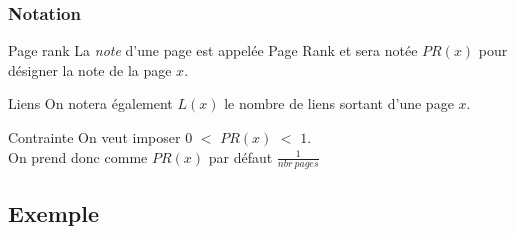 \documentclass{beamer}
\begin{document}
\begin{frame}
  \tableofcontents[currentsection,subsectionstyle=hide]
\end{frame}

\begin{frame}
  \frametitle{Notation}

  \begin{block}{Page rank}
    La \emph{note} d'une page est appelée Page Rank et sera notée $PR(x)$
    pour désigner la note de la page $x$.
  \end{block}

  \pause

  \begin{block}{Liens}
    On notera également $L(x)$ le nombre de liens sortant d'une page
    $x$. 
  \end{block}

  \pause

  \begin{block}{Contrainte}
    On veut imposer $0$ $<$ $PR(x)$ $<$ $1$.\\
    On prend donc comme $PR(x)$ par défaut $\frac{1}{nbr\ pages}$ 
  \end{block}
\end{frame}

\subsection{Exemple}
\end{document}
